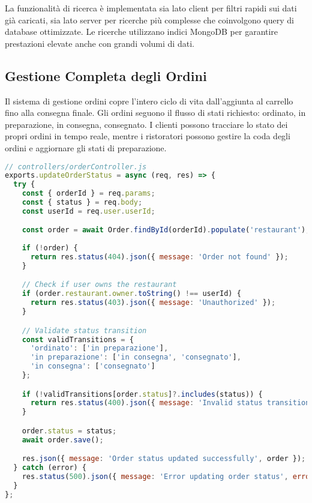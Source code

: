 \documentclass[12pt,a4paper]{article}
\begin{document}
La funzionalità di ricerca è implementata sia lato client per filtri rapidi sui dati già caricati, sia lato server per ricerche più complesse che coinvolgono query di database ottimizzate. Le ricerche utilizzano indici MongoDB per garantire prestazioni elevate anche con grandi volumi di dati.

\subsection{Gestione Completa degli Ordini}

Il sistema di gestione ordini copre l'intero ciclo di vita dall'aggiunta al carrello fino alla consegna finale. Gli ordini seguono il flusso di stati richiesto: ordinato, in preparazione, in consegna, consegnato. I clienti possono tracciare lo stato dei propri ordini in tempo reale, mentre i ristoratori possono gestire la coda degli ordini e aggiornare gli stati di preparazione.

\begin{lstlisting}[language=JavaScript, caption=Controller per la gestione ordini]
// controllers/orderController.js
exports.updateOrderStatus = async (req, res) => {
  try {
    const { orderId } = req.params;
    const { status } = req.body;
    const userId = req.user.userId;

    const order = await Order.findById(orderId).populate('restaurant');
    
    if (!order) {
      return res.status(404).json({ message: 'Order not found' });
    }

    // Check if user owns the restaurant
    if (order.restaurant.owner.toString() !== userId) {
      return res.status(403).json({ message: 'Unauthorized' });
    }

    // Validate status transition
    const validTransitions = {
      'ordinato': ['in preparazione'],
      'in preparazione': ['in consegna', 'consegnato'],
      'in consegna': ['consegnato']
    };

    if (!validTransitions[order.status]?.includes(status)) {
      return res.status(400).json({ message: 'Invalid status transition' });
    }

    order.status = status;
    await order.save();

    res.json({ message: 'Order status updated successfully', order });
  } catch (error) {
    res.status(500).json({ message: 'Error updating order status', error: error.message });
  }
};
\end{lstlisting}
\end{document}
